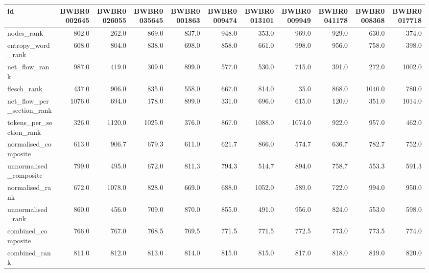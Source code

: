 \begin{tabular}{lrrrrrrrrrr}
\toprule
id & BWBR0002645 & BWBR0026055 & BWBR0035645 & BWBR0001863 & BWBR0009474 & BWBR0013101 & BWBR0009949 & BWBR0041178 & BWBR0008368 & BWBR0017718 \\
\midrule
nodes\_rank & 802.0 & 262.0 & 869.0 & 837.0 & 948.0 & 353.0 & 969.0 & 929.0 & 630.0 & 374.0 \\
\cline{1-11}
entropy\_word\_rank & 608.0 & 804.0 & 838.0 & 698.0 & 858.0 & 661.0 & 998.0 & 956.0 & 758.0 & 398.0 \\
\cline{1-11}
net\_flow\_rank & 987.0 & 419.0 & 309.0 & 899.0 & 577.0 & 530.0 & 715.0 & 391.0 & 272.0 & 1002.0 \\
\cline{1-11}
flesch\_rank & 437.0 & 906.0 & 835.0 & 558.0 & 667.0 & 814.0 & 35.0 & 868.0 & 1040.0 & 780.0 \\
\cline{1-11}
net\_flow\_per\_section\_rank & 1076.0 & 694.0 & 178.0 & 899.0 & 331.0 & 696.0 & 615.0 & 120.0 & 351.0 & 1014.0 \\
\cline{1-11}
tokens\_per\_section\_rank & 326.0 & 1120.0 & 1025.0 & 376.0 & 867.0 & 1088.0 & 1074.0 & 922.0 & 957.0 & 462.0 \\
\cline{1-11}
normalised\_composite & 613.0 & 906.7 & 679.3 & 611.0 & 621.7 & 866.0 & 574.7 & 636.7 & 782.7 & 752.0 \\
\cline{1-11}
unnormalised\_composite & 799.0 & 495.0 & 672.0 & 811.3 & 794.3 & 514.7 & 894.0 & 758.7 & 553.3 & 591.3 \\
\cline{1-11}
normalised\_rank & 672.0 & 1078.0 & 828.0 & 669.0 & 688.0 & 1052.0 & 589.0 & 722.0 & 994.0 & 950.0 \\
\cline{1-11}
unnormalised\_rank & 860.0 & 456.0 & 709.0 & 870.0 & 855.0 & 491.0 & 956.0 & 824.0 & 553.0 & 598.0 \\
\cline{1-11}
combined\_composite & 766.0 & 767.0 & 768.5 & 769.5 & 771.5 & 771.5 & 772.5 & 773.0 & 773.5 & 774.0 \\
\cline{1-11}
combined\_rank & 811.0 & 812.0 & 813.0 & 814.0 & 815.0 & 815.0 & 817.0 & 818.0 & 819.0 & 820.0 \\
\cline{1-11}
\bottomrule
\end{tabular}
